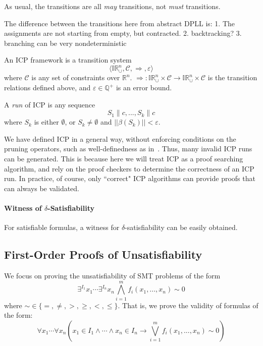 \documentclass[envcountsect]{llncs}
\begin{document}
As usual, the transitions are all {\em may} transitions, not {\em must}
transitions.
\begin{remark}
The difference between the transitions here from abstract DPLL is:
1. The assignments are not starting from empty, but contracted.
2. backtracking?
3. branching can be very nondeterministic
\end{remark}
\begin{definition}
An ICP framework is a transition system
$$\langle \mathbb{IR}_{\cup}^n, \mathcal{C}, \Longrightarrow,
\varepsilon\rangle$$
where $\mathcal{C}$ is any set of constraints over $\mathbb{R}^n$.
$\Longrightarrow: \mathbb{IR}_{\cup}^n\times
\mathcal{C}\rightarrow \mathbb{IR}_{\cup}^n\times \mathcal{C}$ is the transition
relations defined above, and $\varepsilon\in \mathbb{Q}^+$ is an
error bound.

A {\em run} of ICP is any sequence
$$S_1\parallel c, ... , S_k\parallel c$$
where $S_k$ is either $\emptyset$, or $S_k\neq \emptyset$ and
$||\beta(S_k)||<\varepsilon$.
\end{definition}
\begin{remark}
We have defined ICP in a general way, without enforcing conditions
on the pruning operators, such as well-definedness as in~\cite{}. Thus, many
invalid ICP runs can be generated. This is
because here we will treat ICP as a proof searching algorithm, and rely on the
proof checkers to determine the correctness of an ICP run. In practice, of
course, only
``correct" ICP algorithms can provide proofs that can always be validated.
\end{remark}




\paragraph{Witness of $\delta$-Satisfiability}
For satisfiable formulas, a witness for $\delta$-satisfiability can be
easily obtained.


\subsection{First-Order Proofs of Unsatisfiability}

We focus on proving the unsatisfiability of SMT problems of the form
$$\exists^{I_1} x_1\cdots \exists^{I_n} x_n \bigwedge_{i=1}^m
f_i(x_1,...,x_n)\sim 0$$
where $\sim \in \{=,\neq, >, \geq, <, \leq\}$. That is, we prove the validity
of formulas of the form:
$$\forall x_1 \cdots \forall x_n (x_1\in I_1\wedge \cdots \wedge x_n\in I_n
\rightarrow \bigvee_{i=1}^m f_i(x_1,...,x_n)\sim 0)$$
\end{document}
